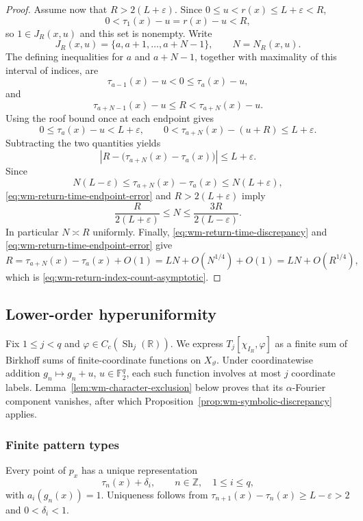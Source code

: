 \documentclass[11pt,reqno,a4paper]{amsart}
\numberwithin{equation}{section}
\theoremstyle{compact}
\theoremstyle{definition}
\theoremstyle{definition}
\newcommand{\Sh}{\operatorname{Sh}}
\begin{document}
\begin{proof}
Assume now that $R>2(L+\varepsilon)$.  Since
$0\leq u<r(x)\leq L+\varepsilon<R$,
\[
  0<\tau_1(x)-u=r(x)-u<R,
\]
so $1\in J_R(x,u)$ and this set is nonempty.  Write
\[
  J_R(x,u)=\{a,a+1,\ldots,a+N-1\},
  \qquad N=N_R(x,u).
\]
The defining inequalities for $a$ and $a+N-1$, together with maximality of
this interval of indices, are
\[
  \tau_{a-1}(x)-u<0\leq\tau_a(x)-u,
\]
and
\[
  \tau_{a+N-1}(x)-u\leq R<\tau_{a+N}(x)-u.
\]
Using the roof bound once at each endpoint gives
\[
  0\leq\tau_a(x)-u<L+\varepsilon,
  \qquad
  0<\tau_{a+N}(x)-(u+R)\leq L+\varepsilon.
\]
Subtracting the two quantities yields
\begin{equation}\label{eq:wm-return-time-endpoint-error}
  \left|R-\bigl(\tau_{a+N}(x)-\tau_a(x)\bigr)\right|
  \leq L+\varepsilon.
\end{equation}
Since
\[
  N(L-\varepsilon)
  \leq \tau_{a+N}(x)-\tau_a(x)
  \leq N(L+\varepsilon),
\]
\eqref{eq:wm-return-time-endpoint-error} and $R>2(L+\varepsilon)$ imply
\[
  \frac{R}{2(L+\varepsilon)}
  \leq N
  \leq \frac{3R}{2(L-\varepsilon)}.
\]
In particular $N\asymp R$ uniformly.  Finally,
\eqref{eq:wm-return-time-discrepancy} and
\eqref{eq:wm-return-time-endpoint-error} give
\[
  R
  =\tau_{a+N}(x)-\tau_a(x)+O(1)
  =LN+O(N^{1/4})+O(1)
  =LN+O(R^{1/4}),
\]
which is \eqref{eq:wm-return-index-count-asymptotic}.
\end{proof}

\subsection{Lower-order hyperuniformity}
\label{subsec:wm-lower-order}

Fix $1\leq j<q$ and $\varphi\in C_c(\Sh_j(\mathbb R))$.  We express
$T_j[\chi_{I_R},\varphi]$ as a finite sum of Birkhoff sums of
finite-coordinate functions on $X_\vartheta$.  Under coordinatewise addition
$g_n\mapsto g_n+u$, $u\in\mathbb F_2^q$, each such function involves at most
$j$ coordinate labels.  Lemma~\ref{lem:wm-character-exclusion} below proves
that its $\alpha$-Fourier component vanishes, after which
Proposition~\ref{prop:wm-symbolic-discrepancy} applies.

\subsubsection{Finite pattern types}

Every point of $p_x$ has a unique representation
\begin{equation}\label{eq:wm-point-index-label}
  \tau_n(x)+\delta_i,
  \qquad n\in\mathbb Z,\quad 1\leq i\leq q,
\end{equation}
with $a_i(g_n(x))=1$.  Uniqueness follows from
$\tau_{n+1}(x)-\tau_n(x)\geq L-\varepsilon>2$ and
$0<\delta_i<1$.
\end{document}
